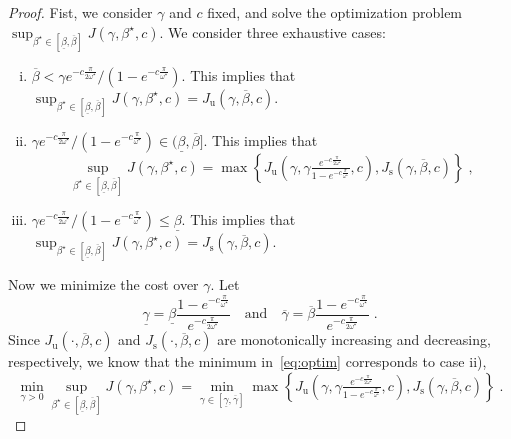 \documentclass[10pt,a4paper]{amsart}
\newcommand{\rs}{\mathrm{s}}
\newcommand{\ru}{\mathrm{u}}
\begin{document}
\begin{proof}
    Fist, we consider $\gamma$ and $c$ fixed, and solve the optimization problem $\sup_{\beta^\star \in [\underline{\beta}, \overline{\beta}]} J(\gamma,\beta^\star,c)$. We consider three exhaustive cases:
    \begin{enumerate}[i)]
        \item $\overline{\beta} < \gamma e^{-c\frac{\pi}{2\omega^\star}}/(1 - e^{-c\frac{\pi}{\omega^\star}})$. This implies that $\sup_{\beta^\star \in [\underline{\beta}, \overline{\beta}]} J(\gamma,\beta^\star,c) = J_\ru(\gamma,\overline{\beta},c)$.
        \item $\gamma e^{-c\frac{\pi}{2\omega^\star}}/(1 - e^{-c\frac{\pi}{\omega^\star}}) \in (\underline{\beta}, \overline{\beta}]$. This implies that
        \begin{displaymath}
            \sup_{\beta^\star \in [\underline{\beta}, \overline{\beta}]} J(\gamma,\beta^\star,c) = \max\left\{J_\ru\left(\gamma,\gamma\tfrac{e^{-c\frac{\pi}{2\omega^\star}}}{1 - e^{-c\frac{\pi}{\omega^\star}}},c\right), J_\rs(\gamma,\overline{\beta},c)\right\} \;,
        \end{displaymath}
        \item $\gamma e^{-c\frac{\pi}{2\omega^\star}}/(1 - e^{-c\frac{\pi}{\omega^\star}}) \le \underline{\beta}$. This implies that $\sup_{\beta^\star \in [\underline{\beta}, \overline{\beta}]} J(\gamma,\beta^\star,c) = J_\rs(\gamma,\overline{\beta},c)$.
    \end{enumerate}
    Now we minimize the cost over $\gamma$. Let
    \begin{displaymath}
        \underline{\gamma} = \underline{\beta}\frac{1 - e^{-c\frac{\pi}{\omega^\star}}}{e^{-c\frac{\pi}{2\omega^\star}}} \quad \text{and} \quad
        \overline{\gamma} = \overline{\beta}\frac{1 - e^{-c\frac{\pi}{\omega^\star}}}{e^{-c\frac{\pi}{2\omega^\star}}} \;.
    \end{displaymath}
    Since $J_\ru\left(\cdot,\overline{\beta},c\right)$ and $J_\rs\left(\cdot,\overline{\beta},c\right)$ are monotonically increasing and decreasing, respectively, we know that the minimum in~\eqref{eq:optim} corresponds to case ii),
    \begin{displaymath}
        \min_{\gamma > 0} \sup_{\beta^\star \in [\underline{\beta}, \overline{\beta}]} J(\gamma,\beta^\star,c) = \min_{\gamma \in [\underline{\gamma}, \overline{\gamma}]}\max\left\{J_\ru\left(\gamma,\gamma\tfrac{e^{-c\frac{\pi}{2\omega^\star}}}{1 - e^{-c\frac{\pi}{\omega^\star}}},c\right), J_\rs(\gamma,\overline{\beta},c)\right\} \;.

\end{displaymath}
\end{proof}
\end{document}
